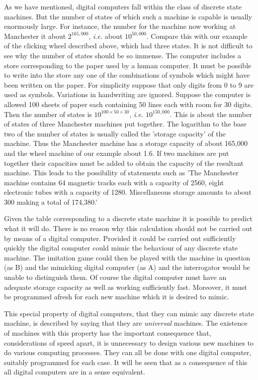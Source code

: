     As we have mentioned, digital computers fall within the class of discrete state machines. But the number of states of which such a machine is capable is usually enormously large. For instance, the number for the machine now working at Manchester it about $2^{165,000}$, \textit{i.e.} about $10^{50,000}$. Compare this with our example of the clicking wheel described above, which had three states. It is not difficult to see why the number of states should be so immense. The computer includes a store corresponding to the paper used by a human computer. It must be possible to write into the store any one of the combinations of symbols which might have been written on the paper. For simplicity suppose that only digits from 0 to 9 are used as symbols. Variations in handwriting are ignored. Suppose the computer is allowed 100 sheets of paper each containing 50 lines each with room for 30 digits. Then the number of states is $10^{100\times50\times30}$, \textit{i.e.} $10^{150,000}$. This is about the number of states of three Manchester machines put together. The logarithm to the base two of the number of states is usually called the 'storage capacity' of the machine. Thus the Manchester machine has a storage capacity of about 165,000 and the wheel machine of our example about 1.6. If two machines are put together their capacities must be added to obtain the capacity of the resultant machine. This leads to the possibility of statements such as 'The Manchester machine contains 64 magnetic tracks each with a capacity of 2560, eight electronic tubes with a capacity of 1280. Miscellaneous storage amounts to about 300 making a total of 174,380.'

    Given the table corresponding to a discrete state machine it is possible to predict what it will do. There is no reason why this calculation should not be carried out by means of a digital computer. Provided it could be carried out sufficiently quickly the digital computer could mimic the behaviour of any discrete state machine. The imitation game could then be played with the machine in question (as B) and the mimicking digital computer (as A) and the interrogator would be unable to distinguish them. Of course the digital computer must have an adequate storage capacity as well as working sufficiently fast. Moreover, it must be programmed afresh for each new machine which it is desired to mimic.

    This special property of digital computers, that they can mimic any discrete state machine, is described by saying that they are \textit{universal} machines. The existence of machines with this property has the important consequence that, considerations of speed apart, it is unnecessary to design various new machines to do various computing processes. They can all be done with one digital computer, suitably programmed for each case. It will be seen that as a consequence of this all digital computers are in a sense equivalent.

